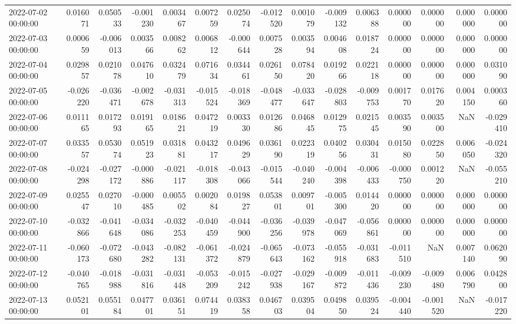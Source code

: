 \begin{tabular}{lrrrrrrrrrrrrrr}
2022-07-02 00:00:00 & 0.016071 & 0.050533 & -0.001230 & 0.003467 & 0.007259 & 0.025074 & -0.012520 & 0.001079 & -0.009132 & 0.006388 & 0.000000 & 0.000000 & 0.000000 & 0.000000 \\
2022-07-03 00:00:00 & 0.000659 & -0.006013 & 0.003566 & 0.008262 & 0.006812 & -0.000644 & 0.007528 & 0.003594 & 0.004608 & 0.018724 & 0.000000 & 0.000000 & 0.000000 & 0.000000 \\
2022-07-04 00:00:00 & 0.029857 & 0.021078 & 0.047610 & 0.032479 & 0.071634 & 0.034461 & 0.026150 & 0.078420 & 0.019266 & 0.022118 & 0.000000 & 0.000000 & 0.000000 & 0.031090 \\
2022-07-05 00:00:00 & -0.026220 & -0.036471 & -0.002678 & -0.031313 & -0.015524 & -0.018369 & -0.048477 & -0.033647 & -0.028803 & -0.009753 & 0.001770 & 0.017620 & 0.004150 & 0.000360 \\
2022-07-06 00:00:00 & 0.011165 & 0.017293 & 0.019165 & 0.018621 & 0.047219 & 0.003330 & 0.012686 & 0.046845 & 0.012975 & 0.021545 & 0.003590 & 0.003500 & NaN & -0.029410 \\
2022-07-07 00:00:00 & 0.033557 & 0.053074 & 0.051923 & 0.031881 & 0.043217 & 0.049629 & 0.036190 & 0.022319 & 0.040256 & 0.030431 & 0.015080 & 0.022850 & 0.006050 & -0.024320 \\
2022-07-08 00:00:00 & -0.024298 & -0.027172 & -0.000886 & -0.021117 & -0.018308 & -0.043066 & -0.015544 & -0.040240 & -0.004398 & -0.006433 & -0.000750 & 0.001220 & NaN & -0.055210 \\
2022-07-09 00:00:00 & 0.025547 & 0.027010 & -0.000485 & 0.005502 & 0.002084 & 0.019827 & 0.053801 & 0.009701 & -0.005300 & 0.014420 & 0.000000 & 0.000000 & 0.000000 & 0.000000 \\
2022-07-10 00:00:00 & -0.032866 & -0.041648 & -0.034086 & -0.032253 & -0.040459 & -0.044900 & -0.036256 & -0.039978 & -0.047069 & -0.056861 & 0.000000 & 0.000000 & 0.000000 & 0.000000 \\
2022-07-11 00:00:00 & -0.060173 & -0.072680 & -0.043282 & -0.082131 & -0.061372 & -0.024879 & -0.065643 & -0.073162 & -0.055918 & -0.031683 & -0.011510 & NaN & 0.007140 & 0.062090 \\
2022-07-12 00:00:00 & -0.040765 & -0.018988 & -0.031816 & -0.031448 & -0.053209 & -0.015242 & -0.027938 & -0.029167 & -0.009872 & -0.011436 & -0.009230 & -0.009480 & 0.006790 & 0.042800 \\
2022-07-13 00:00:00 & 0.052101 & 0.055184 & 0.047701 & 0.036151 & 0.074419 & 0.038358 & 0.046703 & 0.039504 & 0.049850 & 0.039524 & -0.004440 & -0.001520 & NaN & -0.017220 \\

\end{tabular}
